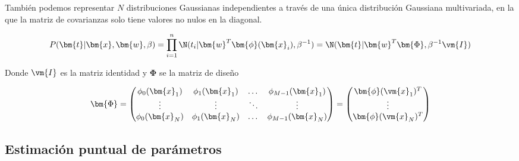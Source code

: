 \documentclass[a4paper,10pt]{article}
\begin{document}
% 
% 
% 
%     
%     
%       

Tambi\'en podemos representar $N$ distribuciones Gaussianas independientes a trav\'es de una \'unica distribuci\'on Gaussiana multivariada, en la que la matriz de covarianzas solo tiene valores no nulos en la diagonal.

\begin{equation}
P(\bm{t} | \bm{x}, \bm{w}, \beta) = \prod_{i=1}^n \N(t_i | \bm{w}^T \bm{\phi}(\bm{x}_i) , \beta^{-1}) = \N(\bm{t}|\bm{w}^T \bm{\Phi}, \beta^{-1} \vm{I})
\end{equation}

Donde $\vm{I}$ es la matriz identidad y $\bm{\Phi}$ se la matriz de diseño

\begin{equation}
 \bm{\Phi} =
  \begin{pmatrix}
    \phi_0(\bm{x}_1) & \phi_1(\bm{x}_1) & \dots & \phi_{M-1}(\bm{x}_1)\\
    \vdots & \vdots & \ddots & \vdots \\
    \phi_0(\bm{x}_N) & \phi_1(\bm{x}_N) & \dots & \phi_{M-1}(\bm{x}_N)
  \end{pmatrix}
  = 
  \begin{pmatrix}
   \bm{\phi}(\vm{x}_1)^T \\
   \vdots \\
   \bm{\phi}(\vm{x}_N)^T \\
  \end{pmatrix}
\end{equation}


\subsection{Estimaci\'on puntual de par\'ametros}
\end{document}
